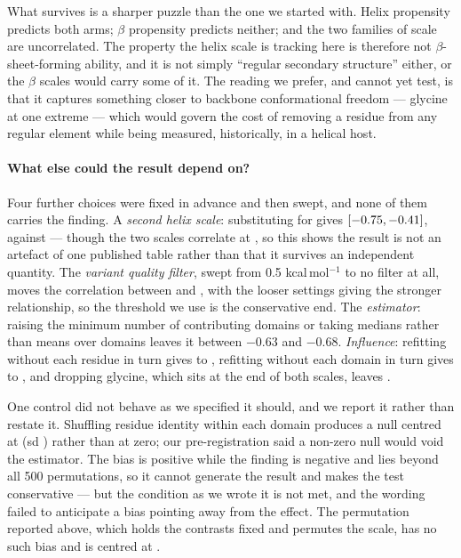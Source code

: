 \documentclass[11pt]{article}
\begin{document}
What survives is a sharper puzzle than the one we started with. Helix propensity predicts both
arms; $\beta$ propensity predicts neither; and the two families of scale are uncorrelated. The
property the helix scale is tracking here is therefore not $\beta$-sheet-forming ability, and it
is not simply ``regular secondary structure'' either, or the $\beta$ scales would carry some of
it. The reading we prefer, and cannot yet test, is that it captures something closer to backbone
conformational freedom --- glycine at one extreme --- which would govern the cost of removing a
residue from any regular element while being measured, historically, in a helical host.

\paragraph{What else could the result depend on?} Four further choices were fixed in advance
and then swept, and none of them carries the finding. A \emph{second helix scale}: substituting
\citet{oneil1990} for \citet{pace1998} gives \RhoONeil{} $[-0.75{}, -0.41{}]$, against
\RhoPace{} --- though the two scales correlate at \ScaleAgree{}, so this shows the result is not
an artefact of one published table rather than that it survives an independent quantity.
The \emph{variant quality filter}, swept from 0.5 kcal\,mol$^{-1}$ to no filter at all, moves
the correlation between \FilterLo{} and \FilterHi{}, with the looser settings giving the
stronger relationship, so the threshold we use is the conservative end. The \emph{estimator}:
raising the minimum number of contributing domains or taking medians rather than means over
domains leaves it between $-0.63$ and $-0.68$. \emph{Influence}: refitting without each residue
in turn gives \LoroLo{} to \LoroHi{}, refitting without each domain in turn gives \LodoLo{} to
\LodoHi{}, and dropping glycine, which sits at the end of both scales, leaves \RhoNoGly{}.

One control did not behave as we specified it should, and we report it rather than restate it.
Shuffling residue identity within each domain produces a null centred at \ShufMean{} (sd
\ShufSD{}) rather than at zero; our pre-registration said a non-zero null would void the
estimator. The bias is positive while the finding is negative and lies beyond all 500
permutations, so it cannot generate the result and makes the test conservative --- but the
condition as we wrote it is not met, and the wording failed to anticipate a bias pointing away
from the effect. The permutation reported above, which holds the contrasts fixed and permutes
the scale, has no such bias and is centred at \PermMean{}.
\end{document}
